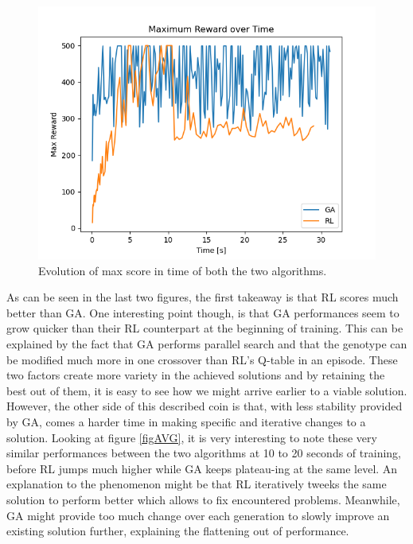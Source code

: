 \begin{figure}[H]
	\centering
	\includegraphics [scale = 0.5]{Images/RL_GA_comparison_max.png}
	\caption{Evolution of max score in time of both the two algorithms.}
	\label{figMAX}
\end{figure}

As can be seen in the last two figures, the first takeaway is that RL scores much better than GA.
One interesting point though, is that GA performances seem to grow quicker than their RL counterpart at the beginning of training.
This can be explained by the fact that GA performs parallel search and that the genotype can be modified much more in one crossover than RL's Q-table in an episode. 
These two factors create more variety in the achieved solutions and by retaining the best out of them, it is easy to see how we might arrive earlier to a viable solution.
\\
However, the other side of this described coin is that, with less stability provided by GA, comes a harder time in making specific and iterative changes to a solution.
Looking at figure \ref{figAVG}, it is very interesting to note these very similar performances between the two algorithms at 10 to 20 seconds of training, before RL jumps much higher while GA keeps plateau-ing at the same level.
An explanation to the phenomenon might be that RL iteratively tweeks the same solution to perform better which allows to fix encountered problems. Meanwhile, GA might provide too much change over each generation to slowly improve an existing solution further, explaining the flattening out of performance.

